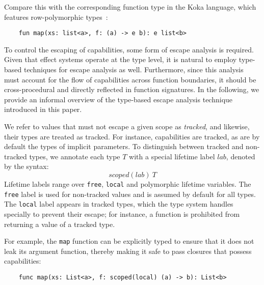 \documentclass[acmsmall]{acmart}
\newcommand{\ap}{~}
\begin{document}
Compare this with the corresponding function type in the Koka language, which features row-polymorphic types~\cite{leijen2014koka}:
\begin{verbatim}
    fun map(xs: list<a>, f: (a) -> e b): e list<b>
\end{verbatim}

To control the escaping of capabilities, some form of escape analysis is required. %
Given that effect systems operate at the type level, it is natural to employ type-based techniques for escape analysis as well.
Furthermore, since this analysis must account for the flow of capabilities across function boundaries, it should be cross-procedural and directly reflected in function signatures.
In the following, we provide an informal overview of the type-based escape analysis technique introduced in this paper.

We refer to values that must not escape a given scope as \textit{tracked}, and likewise, their types are treated as tracked.
For instance, capabilities are tracked, as are by default the types of implicit parameters.
To distinguish between tracked and non-tracked types, we annotate each type $T$ with a special lifetime label $lab$, denoted by the syntax:
\[scoped(lab)\ap T\]
Lifetime labels range over \texttt{free}, \texttt{local} and polymorphic lifetime variables.
The \texttt{free} label is used for non-tracked values and is assumed by default for all types.
The \texttt{local} label appears in tracked types, which the type system handles specially to prevent their escape; for instance, a function is prohibited from returning a value of a tracked type.

For example, the \texttt{map} function can be explicitly typed to ensure that it does not leak its argument function, thereby making it safe to pass closures that possess capabilities:
\begin{verbatim}
    func map(xs: List<a>, f: scoped(local) (a) -> b): List<b>
\end{verbatim}
\end{document}
